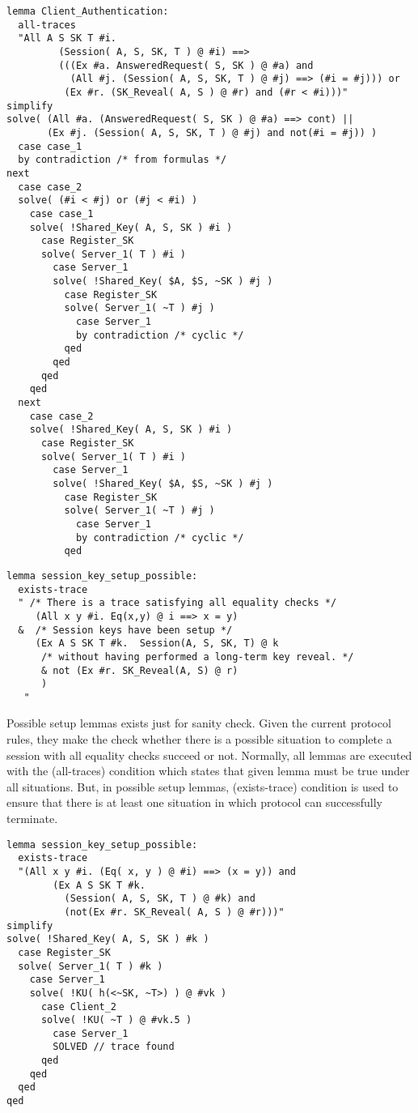 \documentclass[a4paper, 12pt, titlepage]{article}
\begin{document}
\begin{lstlisting}[caption = Execution results are positive for authentication lemma of CRAM-MD5 protocol]
lemma Client_Authentication:
  all-traces
  "All A S SK T #i.
         (Session( A, S, SK, T ) @ #i) ==>
         (((Ex #a. AnsweredRequest( S, SK ) @ #a) and
           (All #j. (Session( A, S, SK, T ) @ #j) ==> (#i = #j))) or
          (Ex #r. (SK_Reveal( A, S ) @ #r) and (#r < #i)))"
simplify
solve( (All #a. (AnsweredRequest( S, SK ) @ #a) ==> cont) ||
       (Ex #j. (Session( A, S, SK, T ) @ #j) and not(#i = #j)) )
  case case_1
  by contradiction /* from formulas */
next
  case case_2
  solve( (#i < #j) or (#j < #i) )
    case case_1
    solve( !Shared_Key( A, S, SK ) #i )
      case Register_SK
      solve( Server_1( T ) #i )
        case Server_1
        solve( !Shared_Key( $A, $S, ~SK ) #j )
          case Register_SK
          solve( Server_1( ~T ) #j )
            case Server_1
            by contradiction /* cyclic */
          qed
        qed
      qed
    qed
  next
    case case_2
    solve( !Shared_Key( A, S, SK ) #i )
      case Register_SK
      solve( Server_1( T ) #i )
        case Server_1
        solve( !Shared_Key( $A, $S, ~SK ) #j )
          case Register_SK
          solve( Server_1( ~T ) #j )
            case Server_1
            by contradiction /* cyclic */
          qed
\end{lstlisting}
\begin{lstlisting}[caption = Implementation of session key possible setup lemma of CRAM-MD5 protocol]
lemma session_key_setup_possible:
  exists-trace
  " /* There is a trace satisfying all equality checks */
	 (All x y #i. Eq(x,y) @ i ==> x = y)
  &  /* Session keys have been setup */
	 (Ex A S SK T #k.  Session(A, S, SK, T) @ k
	  /* without having performed a long-term key reveal. */
	  & not (Ex #r. SK_Reveal(A, S) @ r)
	  )
   "
\end{lstlisting}
Possible setup lemmas exists just for sanity check. Given the current protocol rules, they make the check whether there is a possible situation to complete a session with all equality checks succeed or not. Normally, all lemmas are executed with the (all-traces) condition which states that given lemma must be true under all situations. But, in possible setup lemmas, (exists-trace) condition is used to ensure that there is at least one situation in which protocol can successfully terminate. 
\begin{lstlisting}[caption = Execution results are positive for session key possible setup  lemma of CRAM-MD5 protocol]
lemma session_key_setup_possible:
  exists-trace
  "(All x y #i. (Eq( x, y ) @ #i) ==> (x = y)) and
        (Ex A S SK T #k.
          (Session( A, S, SK, T ) @ #k) and
          (not(Ex #r. SK_Reveal( A, S ) @ #r)))"
simplify
solve( !Shared_Key( A, S, SK ) #k )
  case Register_SK
  solve( Server_1( T ) #k )
    case Server_1
    solve( !KU( h(<~SK, ~T>) ) @ #vk )
      case Client_2
      solve( !KU( ~T ) @ #vk.5 )
        case Server_1
        SOLVED // trace found
      qed
    qed
  qed
qed
\end{lstlisting}
\end{document}
